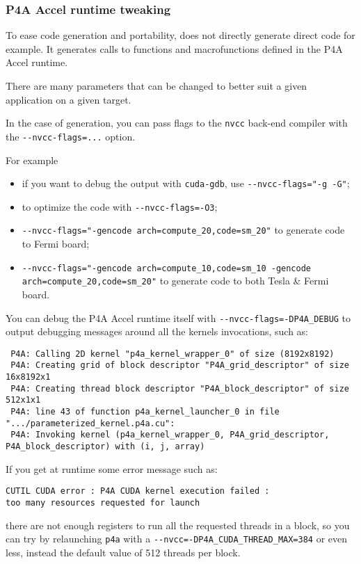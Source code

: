 \documentclass[a4paper]{article}
\begin{document}
\subsubsection{P4A Accel runtime tweaking}
\label{sec:p4a-accel-runtime}

To ease code generation and portability, \Apfa does not directly generate
direct \Acuda code for example. It generates calls to functions and
macrofunctions defined in the P4A Accel runtime.

There are many parameters that can be changed to better suit a given
application on a given target.

In the case of \Acuda generation, you can pass flags to the \texttt{nvcc}
back-end compiler with the \verb|--nvcc-flags=...| option.

For example
\begin{itemize}
\item if you want to debug the output with \texttt{cuda-gdb}, use
  \verb|--nvcc-flags="-g -G"|;
\item to optimize the \Acuda code with \verb|--nvcc-flags=-O3|;
\item \verb|--nvcc-flags="-gencode arch=compute_20,code=sm_20"| to
  generate code to Fermi board;
\item
  \verb|--nvcc-flags="-gencode arch=compute_10,code=sm_10 -gencode arch=compute_20,code=sm_20"|
  to generate code to both Tesla \& Fermi board.
\end{itemize}

You can debug the P4A Accel runtime itself with
\verb|--nvcc-flags=-DP4A_DEBUG| to output debugging messages around all
the \Acuda kernels invocations, such as: {\scriptsize
\begin{verbatim}
 P4A: Calling 2D kernel "p4a_kernel_wrapper_0" of size (8192x8192)
 P4A: Creating grid of block descriptor "P4A_grid_descriptor" of size 16x8192x1
 P4A: Creating thread block descriptor "P4A_block_descriptor" of size 512x1x1
 P4A: line 43 of function p4a_kernel_launcher_0 in file ".../parameterized_kernel.p4a.cu":
 P4A: Invoking kernel (p4a_kernel_wrapper_0, P4A_grid_descriptor, P4A_block_descriptor) with (i, j, array)
\end{verbatim}
}

If you get at runtime some error message such as:
\begin{verbatim}
CUTIL CUDA error : P4A CUDA kernel execution failed :
too many resources requested for launch
\end{verbatim}
there are not enough registers to run all the requested threads in a block,
so you can try by relaunching \texttt{p4a} with a
\verb|--nvcc=-DP4A_CUDA_THREAD_MAX=384| or even less, instead the default
value of 512 threads per block.
\end{document}
